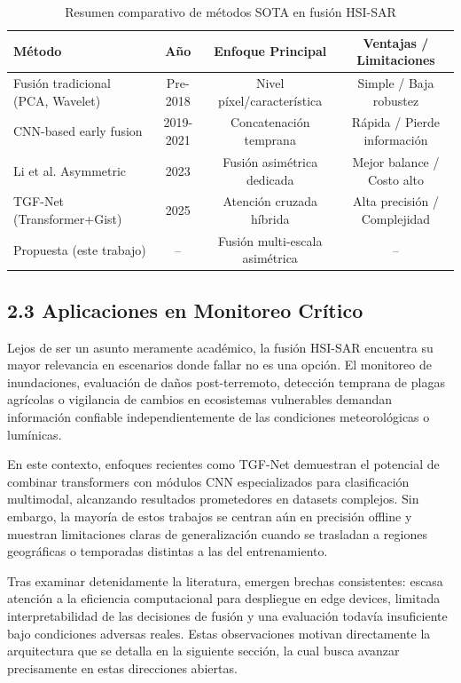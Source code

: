 \begin{table}[h]
\centering
\caption{Resumen comparativo de métodos SOTA en fusión HSI-SAR}
\label{tab:sota_methods}
\begin{tabular}{lccc}
\hline
\textbf{Método} & \textbf{Año} & \textbf{Enfoque Principal} & \textbf{Ventajas / Limitaciones} \\
\hline
Fusión tradicional (PCA, Wavelet) & Pre-2018 & Nivel píxel/característica & Simple / Baja robustez \\
CNN-based early fusion & 2019-2021 & Concatenación temprana & Rápida / Pierde información \\
Li et al. Asymmetric & 2023 & Fusión asimétrica dedicada & Mejor balance / Costo alto \\
TGF-Net (Transformer+Gist) & 2025 & Atención cruzada híbrida & Alta precisión / Complejidad \\
Propuesta (este trabajo) & -- & Fusión multi-escala asimétrica & -- \\
\hline
\end{tabular}
\end{table}

\subsection{2.3 Aplicaciones en Monitoreo Crítico}

Lejos de ser un asunto meramente académico, la fusión HSI-SAR encuentra su mayor relevancia en escenarios donde fallar no es una opción. El monitoreo de inundaciones, evaluación de daños post-terremoto, detección temprana de plagas agrícolas o vigilancia de cambios en ecosistemas vulnerables demandan información confiable independientemente de las condiciones meteorológicas o lumínicas.

En este contexto, enfoques recientes como TGF-Net \cite{Wang2025TGF} demuestran el potencial de combinar transformers con módulos CNN especializados para clasificación multimodal, alcanzando resultados prometedores en datasets complejos. Sin embargo, la mayoría de estos trabajos se centran aún en precisión offline y muestran limitaciones claras de generalización cuando se trasladan a regiones geográficas o temporadas distintas a las del entrenamiento.

Tras examinar detenidamente la literatura, emergen brechas consistentes: escasa atención a la eficiencia computacional para despliegue en edge devices, limitada interpretabilidad de las decisiones de fusión y una evaluación todavía insuficiente bajo condiciones adversas reales. Estas observaciones motivan directamente la arquitectura que se detalla en la siguiente sección, la cual busca avanzar precisamente en estas direcciones abiertas.